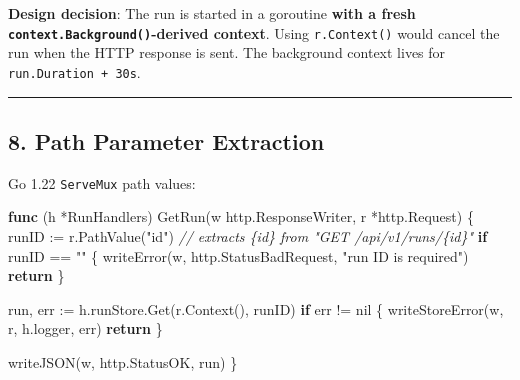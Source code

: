 \documentclass[
]{article}
\newenvironment{Shaded}{}{}
\newcommand{\CommentTok}[1]{\textcolor[rgb]{0.38,0.63,0.69}{\textit{#1}}}
\newcommand{\ControlFlowTok}[1]{\textcolor[rgb]{0.00,0.44,0.13}{\textbf{#1}}}
\newcommand{\KeywordTok}[1]{\textcolor[rgb]{0.00,0.44,0.13}{\textbf{#1}}}
\newcommand{\NormalTok}[1]{#1}
\newcommand{\OperatorTok}[1]{\textcolor[rgb]{0.40,0.40,0.40}{#1}}
\newcommand{\OtherTok}[1]{\textcolor[rgb]{0.00,0.44,0.13}{#1}}
\newcommand{\StringTok}[1]{\textcolor[rgb]{0.25,0.44,0.63}{#1}}
\begin{document}
\textbf{Design decision}: The run is started in a goroutine \textbf{with
a fresh \texttt{context.Background()}-derived context}. Using
\texttt{r.Context()} would cancel the run when the HTTP response is
sent. The background context lives for \texttt{run.Duration\ +\ 30s}.

\begin{center}\rule{0.5\linewidth}{0.5pt}\end{center}

\hypertarget{path-parameter-extraction}{%
\subsection{8. Path Parameter
Extraction}\label{path-parameter-extraction}}

Go 1.22 \texttt{ServeMux} path values:

\begin{Shaded}
\begin{Highlighting}[]
\KeywordTok{func} \OperatorTok{(}\NormalTok{h }\OperatorTok{*}\NormalTok{RunHandlers}\OperatorTok{)}\NormalTok{ GetRun}\OperatorTok{(}\NormalTok{w http}\OperatorTok{.}\NormalTok{ResponseWriter}\OperatorTok{,}\NormalTok{ r }\OperatorTok{*}\NormalTok{http}\OperatorTok{.}\NormalTok{Request}\OperatorTok{)} \OperatorTok{\{}
\NormalTok{    runID }\OperatorTok{:=}\NormalTok{ r}\OperatorTok{.}\NormalTok{PathValue}\OperatorTok{(}\StringTok{"id"}\OperatorTok{)} \CommentTok{// extracts \{id\} from "GET /api/v1/runs/\{id\}"}
    \ControlFlowTok{if}\NormalTok{ runID }\OperatorTok{==} \StringTok{""} \OperatorTok{\{}
\NormalTok{        writeError}\OperatorTok{(}\NormalTok{w}\OperatorTok{,}\NormalTok{ http}\OperatorTok{.}\NormalTok{StatusBadRequest}\OperatorTok{,} \StringTok{"run ID is required"}\OperatorTok{)}
        \ControlFlowTok{return}
    \OperatorTok{\}}

\NormalTok{    run}\OperatorTok{,}\NormalTok{ err }\OperatorTok{:=}\NormalTok{ h}\OperatorTok{.}\NormalTok{runStore}\OperatorTok{.}\NormalTok{Get}\OperatorTok{(}\NormalTok{r}\OperatorTok{.}\NormalTok{Context}\OperatorTok{(),}\NormalTok{ runID}\OperatorTok{)}
    \ControlFlowTok{if}\NormalTok{ err }\OperatorTok{!=} \OtherTok{nil} \OperatorTok{\{}
\NormalTok{        writeStoreError}\OperatorTok{(}\NormalTok{w}\OperatorTok{,}\NormalTok{ r}\OperatorTok{,}\NormalTok{ h}\OperatorTok{.}\NormalTok{logger}\OperatorTok{,}\NormalTok{ err}\OperatorTok{)}
        \ControlFlowTok{return}
    \OperatorTok{\}}

\NormalTok{    writeJSON}\OperatorTok{(}\NormalTok{w}\OperatorTok{,}\NormalTok{ http}\OperatorTok{.}\NormalTok{StatusOK}\OperatorTok{,}\NormalTok{ run}\OperatorTok{)}
\OperatorTok{\}}
\end{Highlighting}
\end{Shaded}
\end{document}
